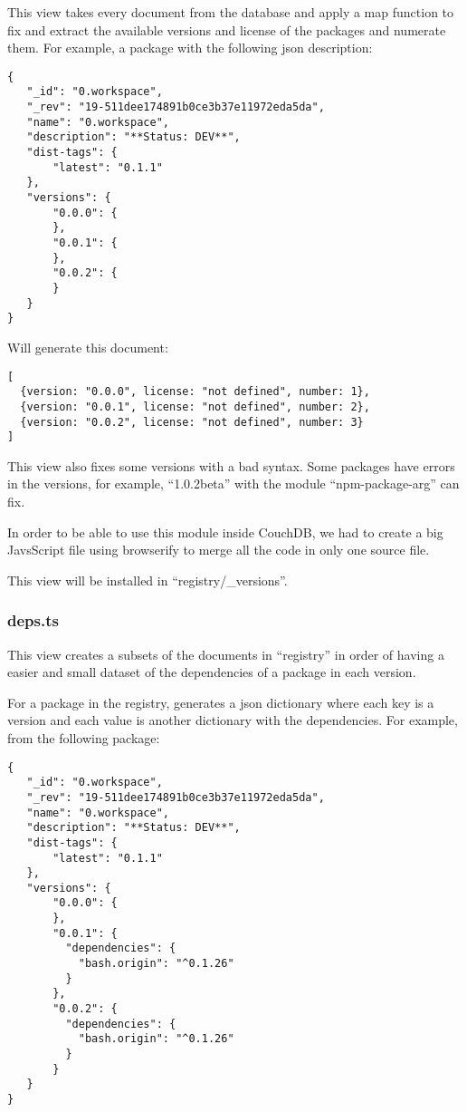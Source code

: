 \documentclass[letterpaper,12pt]{report}
\begin{document}
This view takes every document from the database and apply a map function to fix
and extract the available versions and license of the packages and numerate
them. For example, a package with the following json description:

\begin{verbatim}
{
   "_id": "0.workspace",
   "_rev": "19-511dee174891b0ce3b37e11972eda5da",
   "name": "0.workspace",
   "description": "**Status: DEV**",
   "dist-tags": {
       "latest": "0.1.1"
   },
   "versions": {
       "0.0.0": {
       },
       "0.0.1": {
       },
       "0.0.2": {
       }
   }
}
\end{verbatim}

Will generate this document:

\begin{verbatim}
[
  {version: "0.0.0", license: "not defined", number: 1},
  {version: "0.0.1", license: "not defined", number: 2}, 
  {version: "0.0.2", license: "not defined", number: 3}
]
\end{verbatim}


This view also fixes some versions with a bad syntax. Some packages have errors
in the versions, for example, ``1.0.2beta'' with the module ``npm-package-arg''
can fix.

In order to be able to use this module inside CouchDB, we had to create a big
JavsScript file using browserify to merge all the code in only one source file.

This view will be installed in ``registry/\_versions''.


\subsubsection{deps.ts}

This view creates a subsets of the documents in ``registry'' in order of having
a easier and small dataset of the dependencies of a package in each version.

For a package in the registry, generates a json dictionary where each key is a
version and each value is another dictionary with the dependencies. For example,
from the following package:

\begin{verbatim}
{
   "_id": "0.workspace",
   "_rev": "19-511dee174891b0ce3b37e11972eda5da",
   "name": "0.workspace",
   "description": "**Status: DEV**",
   "dist-tags": {
       "latest": "0.1.1"
   },
   "versions": {
       "0.0.0": {
       },
       "0.0.1": {
         "dependencies": {
           "bash.origin": "^0.1.26"
         }
       },
       "0.0.2": {
         "dependencies": {
           "bash.origin": "^0.1.26"
         }
       }
   }
}
\end{verbatim}
\end{document}
